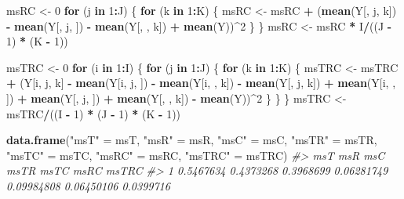 \documentclass[
]{book}
\newenvironment{Shaded}{\begin{snugshade}}{\end{snugshade}}
\newcommand{\CommentTok}[1]{\textcolor[rgb]{0.56,0.35,0.01}{\textit{#1}}}
\newcommand{\ControlFlowTok}[1]{\textcolor[rgb]{0.13,0.29,0.53}{\textbf{#1}}}
\newcommand{\DecValTok}[1]{\textcolor[rgb]{0.00,0.00,0.81}{#1}}
\newcommand{\KeywordTok}[1]{\textcolor[rgb]{0.13,0.29,0.53}{\textbf{#1}}}
\newcommand{\NormalTok}[1]{#1}
\newcommand{\OperatorTok}[1]{\textcolor[rgb]{0.81,0.36,0.00}{\textbf{#1}}}
\newcommand{\StringTok}[1]{\textcolor[rgb]{0.31,0.60,0.02}{#1}}
\begin{document}
\begin{Shaded}
\begin{Highlighting}[]
\NormalTok{msRC <-}\StringTok{ }\DecValTok{0}
\ControlFlowTok{for}\NormalTok{ (j }\ControlFlowTok{in} \DecValTok{1}\OperatorTok{:}\NormalTok{J) \{}
  \ControlFlowTok{for}\NormalTok{ (k }\ControlFlowTok{in} \DecValTok{1}\OperatorTok{:}\NormalTok{K) \{}
\NormalTok{    msRC <-}\StringTok{ }\NormalTok{msRC }\OperatorTok{+}\StringTok{ }
\StringTok{      }\NormalTok{(}\KeywordTok{mean}\NormalTok{(Y[, j, k]) }\OperatorTok{-}\StringTok{ }\KeywordTok{mean}\NormalTok{(Y[, j, ]) }\OperatorTok{-}\StringTok{ }\KeywordTok{mean}\NormalTok{(Y[, , k]) }\OperatorTok{+}\StringTok{ }\KeywordTok{mean}\NormalTok{(Y))}\OperatorTok{^}\DecValTok{2}
\NormalTok{  \}}
\NormalTok{\}}
\NormalTok{msRC <-}\StringTok{ }\NormalTok{msRC }\OperatorTok{*}\StringTok{ }\NormalTok{I}\OperatorTok{/}\NormalTok{((J }\OperatorTok{-}\StringTok{ }\DecValTok{1}\NormalTok{) }\OperatorTok{*}\StringTok{ }\NormalTok{(K }\OperatorTok{-}\StringTok{ }\DecValTok{1}\NormalTok{))}

\NormalTok{msTRC <-}\StringTok{ }\DecValTok{0}
\ControlFlowTok{for}\NormalTok{ (i }\ControlFlowTok{in} \DecValTok{1}\OperatorTok{:}\NormalTok{I) \{}
  \ControlFlowTok{for}\NormalTok{ (j }\ControlFlowTok{in} \DecValTok{1}\OperatorTok{:}\NormalTok{J) \{}
    \ControlFlowTok{for}\NormalTok{ (k }\ControlFlowTok{in} \DecValTok{1}\OperatorTok{:}\NormalTok{K) \{}
\NormalTok{      msTRC <-}\StringTok{ }\NormalTok{msTRC }\OperatorTok{+}\StringTok{ }\NormalTok{(Y[i, j, k] }\OperatorTok{-}\StringTok{ }\KeywordTok{mean}\NormalTok{(Y[i, j, ]) }\OperatorTok{-}\StringTok{ }
\StringTok{                          }\KeywordTok{mean}\NormalTok{(Y[i, , k]) }\OperatorTok{-}\StringTok{ }\KeywordTok{mean}\NormalTok{(Y[, j, k]) }\OperatorTok{+}\StringTok{ }
\StringTok{                          }\KeywordTok{mean}\NormalTok{(Y[i, , ]) }\OperatorTok{+}\StringTok{ }\KeywordTok{mean}\NormalTok{(Y[, j, ]) }\OperatorTok{+}\StringTok{ }
\StringTok{                          }\KeywordTok{mean}\NormalTok{(Y[, , k]) }\OperatorTok{-}\StringTok{ }\KeywordTok{mean}\NormalTok{(Y))}\OperatorTok{^}\DecValTok{2}
\NormalTok{    \}}
\NormalTok{  \}}
\NormalTok{\}}
\NormalTok{msTRC <-}\StringTok{ }\NormalTok{msTRC}\OperatorTok{/}\NormalTok{((I }\OperatorTok{-}\StringTok{ }\DecValTok{1}\NormalTok{) }\OperatorTok{*}\StringTok{ }\NormalTok{(J }\OperatorTok{-}\StringTok{ }\DecValTok{1}\NormalTok{) }\OperatorTok{*}\StringTok{ }\NormalTok{(K }\OperatorTok{-}\StringTok{ }\DecValTok{1}\NormalTok{))}

\KeywordTok{data.frame}\NormalTok{(}\StringTok{"msT"}\NormalTok{ =}\StringTok{ }\NormalTok{msT, }\StringTok{"msR"}\NormalTok{ =}\StringTok{ }\NormalTok{msR, }\StringTok{"msC"}\NormalTok{ =}\StringTok{ }\NormalTok{msC, }
           \StringTok{"msTR"}\NormalTok{ =}\StringTok{ }\NormalTok{msTR, }\StringTok{"msTC"}\NormalTok{ =}\StringTok{ }\NormalTok{msTC, }
           \StringTok{"msRC"}\NormalTok{ =}\StringTok{ }\NormalTok{msRC, }\StringTok{"msTRC"}\NormalTok{ =}\StringTok{ }\NormalTok{msTRC)}
\CommentTok{#>         msT       msR       msC       msTR       msTC       msRC     msTRC}
\CommentTok{#> 1 0.5467634 0.4373268 0.3968699 0.06281749 0.09984808 0.06450106 0.0399716}


\end{Highlighting}
\end{Shaded}
\end{document}

